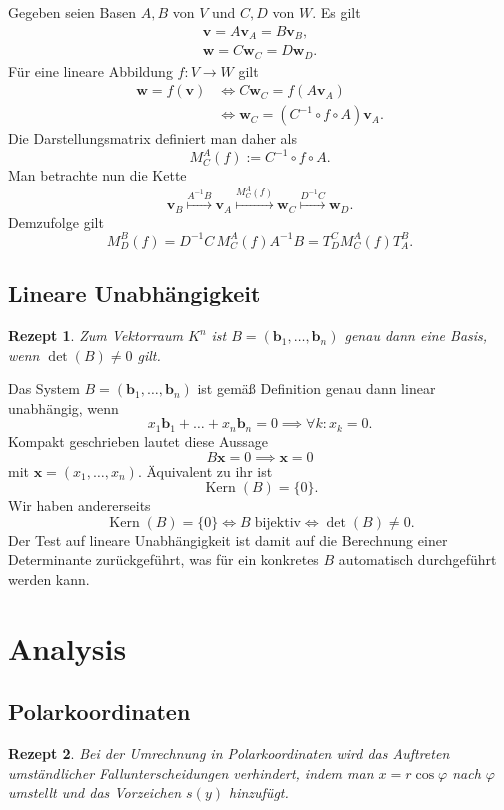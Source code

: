 \documentclass[a4paper,10pt,fleqn,twocolumn,twoside,dvipdfmx]{scrartcl}
\theoremstyle{rmbox}
\newtheorem{Rezept}{Rezept}[section]
\newcommand{\bv}[1]{\mathbf{#1}}
\begin{document}
\noindent
Gegeben seien Basen $A,B$ von $V$ und $C,D$ von $W$. Es gilt%
\begin{gather*}
\bv v = A\bv v_A = B\bv v_B,\\
\bv w = C\bv w_C = D\bv w_D.
\end{gather*}
Für eine lineare Abbildung $f\colon V\to W$ gilt%
\begin{align*}
\bv w = f(\bv v)&\iff C\bv w_C = f(A\bv v_A)\\
&\iff \bv w_C = (C^{-1}\circ f\circ A)\bv v_A.
\end{align*}
Die Darstellungsmatrix definiert man daher als%
\[M_C^A(f) := C^{-1}\circ f\circ A.\]
Man betrachte nun die Kette%
\[\bv v_B\stackrel{A^{-1}B}\longmapsto \bv v_A
\stackrel{M_C^A(f)}\longmapsto \bv w_C
\stackrel{D^{-1}C}\longmapsto \bv w_D.\]
Demzufolge gilt
\[M_D^B(f) = D^{-1}C\,M_C^A(f)A^{-1}B = T_D^C M_C^A(f) T_A^B.\]

\subsection{Lineare Unabhängigkeit}
\begin{Rezept}
Zum Vektorraum $K^n$ ist $B=(\bv b_1,\ldots,\bv b_n)$ genau dann eine
Basis, wenn $\det(B)\ne 0$ gilt.
\end{Rezept}
Das System $B=(\bv b_1,\ldots,\bv b_n)$ ist gemäß Definition genau
dann linear unabhängig, wenn
\[x_1 \bv b_1+\ldots + x_n\bv b_n = 0\implies \forall k\colon x_k = 0.\]
Kompakt geschrieben lautet diese Aussage
\[B\bv x = 0\implies \bv x=0\]
mit $\bv x = (x_1,\ldots,x_n)$. Äquivalent zu ihr ist
\[\operatorname{Kern}(B) = \{0\}.\]
Wir haben andererseits
\[\operatorname{Kern}(B) = \{0\}\iff B\;\text{bijektiv}\iff \det(B)\ne 0.\]
Der Test auf lineare Unabhängigkeit ist damit auf die Berechnung
einer Determinante zurückgeführt, was für ein konkretes $B$
automatisch durchgeführt werden kann.

\clearpage
\section{Analysis}

\subsection{Polarkoordinaten}

\begin{Rezept}
Bei der Umrechnung in Polarkoordinaten wird das Auftreten
umständlicher Fallunterscheidungen verhindert,
indem man $x=r\cos\varphi$ nach $\varphi$ umstellt
und das Vorzeichen $s(y)$ hinzufügt.
\end{Rezept}
\end{document}
